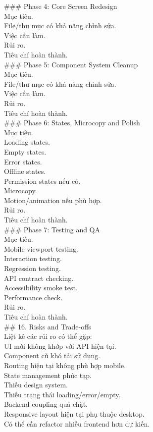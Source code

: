 \begin{enumerate}
\#\#\# Phase 4: Core Screen Redesign \\
\* Mục tiêu. \\
\* File/thư mục có khả năng chỉnh sửa. \\
\* Việc cần làm. \\
\* Rủi ro. \\
\* Tiêu chí hoàn thành. \\


\#\#\# Phase 5: Component System Cleanup \\
\* Mục tiêu. \\
\* File/thư mục có khả năng chỉnh sửa. \\
\* Việc cần làm. \\
\* Rủi ro. \\
\* Tiêu chí hoàn thành. \\


\#\#\# Phase 6: States, Microcopy and Polish \\
\* Mục tiêu. \\
\* Loading states. \\
\* Empty states. \\
\* Error states. \\
\* Offline states. \\
\* Permission states nếu có. \\
\* Microcopy. \\
\* Motion/animation nếu phù hợp. \\
\* Rủi ro. \\
\* Tiêu chí hoàn thành. \\


\#\#\# Phase 7: Testing and QA \\
\* Mục tiêu. \\
\* Mobile viewport testing. \\
\* Interaction testing. \\
\* Regression testing. \\
\* API contract checking. \\
\* Accessibility smoke test. \\
\* Performance check. \\
\* Rủi ro. \\
\* Tiêu chí hoàn thành. \\


\#\# 16. Risks and Trade-offs \\

Liệt kê các rủi ro có thể gặp: \\
\* UI mới không khớp với API hiện tại. \\
\* Component cũ khó tái sử dụng. \\
\* Routing hiện tại không phù hợp mobile. \\
\* State management phức tạp. \\
\* Thiếu design system. \\
\* Thiếu trạng thái loading/error/empty. \\
\* Backend coupling quá chặt. \\
\* Responsive layout hiện tại phụ thuộc desktop. \\
\* Có thể cần refactor nhiều frontend hơn dự kiến. \\



\end{enumerate}
